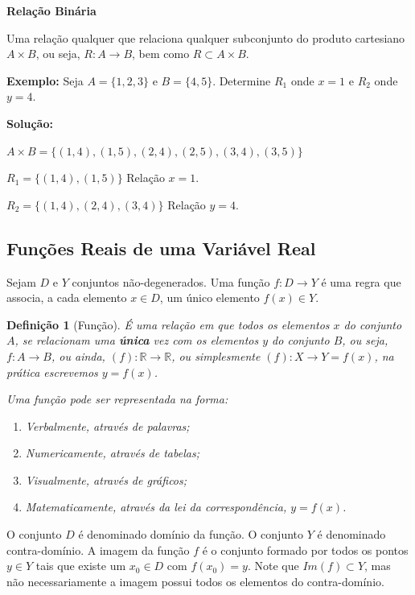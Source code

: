 \documentclass[oneside,a4paper,12pt]{article}
\newtheorem{definition}{Definição}[section]
\begin{document}
\newpage

\textbf{Relação Binária}

Uma relação qualquer que relaciona qualquer subconjunto do produto cartesiano $A \times B$, ou seja, $R: A \rightarrow B$, bem como $R \subset A \times B$.

\textbf{Exemplo:} Seja $A=\{1,2,3\}$ e $B=\{4,5\}$. Determine $R_1$ onde $x=1$ e $R_2$ onde $y=4$.
	
{\bf Solução:}

$A \times B = \{ (1,4), (1,5), (2,4), (2,5), (3,4), (3,5)  \}$

$R_1 = \{ (1,4), (1,5) \}$ Relação $x=1$.

$R_2 = \{ (1,4), (2,4), (3,4)  \}$ Relação $y = 4$.

\newpage
\begin{snugshade}
	\section{Funções Reais de uma Variável Real}
\end{snugshade}	
	
Sejam $D$ e $Y$ conjuntos não-degenerados. Uma função $f:D \rightarrow Y$ é uma regra que associa, a cada elemento $x \in D$, um único elemento $f(x) \in Y$.

\begin{definition}[Função]
	É uma relação em que todos os elementos $x$ do conjunto $A$, se relacionam uma {\bf única} vez com os elementos $y$ do conjunto $B$, ou seja, $f: A \rightarrow B$, ou ainda, $(f): \mathbb{R} \rightarrow \mathbb{R}$, ou simplesmente $(f): X\rightarrow Y = f(x)$, na prática escrevemos $y = f(x)$.
	
	Uma função pode ser representada na forma:
	\begin{enumerate}
		\item Verbalmente, através de palavras;
		\item Numericamente, através de tabelas;
		\item Visualmente, através de gráficos;
		\item Matematicamente, através da lei da correspondência, $y = f(x)$.
	\end{enumerate}
\end{definition}

O conjunto $D$ é denominado domínio da função. O conjunto $Y$ é denominado contra-domínio. A imagem da função $f$ é o conjunto formado por todos os pontos $y \in Y$ tais que existe um $x_0 \in D$ com $f(x_0) = y$. Note que $Im(f) \subset Y$, mas não necessariamente a imagem possui todos os elementos do contra-domínio.
\end{document}
